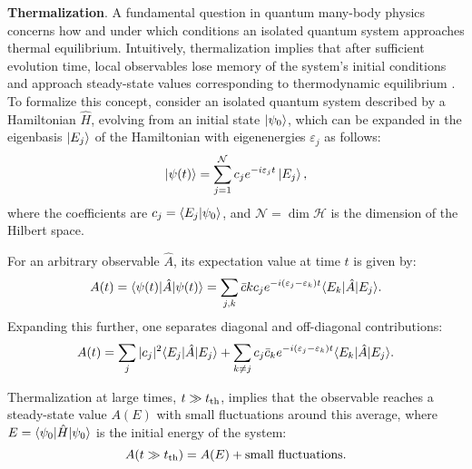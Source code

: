 



\textbf{Thermalization}.
A fundamental question in quantum many-body physics concerns how and under which conditions an isolated quantum system approaches thermal equilibrium. Intuitively, thermalization implies that after sufficient evolution time, local observables lose memory of the system's initial conditions and approach steady-state values corresponding to thermodynamic equilibrium \cite{khlebnikov_thermalization_2014}. To formalize this concept, consider an isolated quantum system described by a Hamiltonian $\hat{H}$, evolving from an initial state $\left| \psi_0 \right\rangle$, which can be expanded in the eigenbasis ${\left| E_j \right\rangle}$ of the Hamiltonian with eigenenergies $\varepsilon_j$ as follows:
\begin{equation}
\left| \psi(t) \right\rangle = \sum_{j=1}^{\mathcal{N}} c_j e^{- i \varepsilon_j t} \left| E_j \right\rangle,
\label{eq:evolution}
\end{equation}
where the coefficients are $c_j = \bk{E_j}{\psi_0}$, and $\mathcal{N} = \dim\mathcal{H}$ is the dimension of the Hilbert space.

For an arbitrary observable $\hat{A}$, its expectation value at time $t$ is given by:
\begin{equation}
A(t) = \bk{\psi(t)}[\hat{A}]{\psi(t)}
= \sum_{j,k} \bar{c}k c_j e^{-i (\varepsilon_j - \varepsilon_k) t} \bk{E_k}[\hat{A}]{E_j}.
\label{eq:observable_time}
\end{equation}
Expanding this further, one separates diagonal and off-diagonal contributions:
\begin{equation}
A(t) = \sum_j |c_j|^2 \bk{E_j}[\hat{A}]{E_j}
+ \sum_{k \neq j} c_j \bar{c}_k e^{-i (\varepsilon_j - \varepsilon_k) t} \bk{E_k}[\hat{A}]{E_j}.
\label{eq:At_expanded}
\end{equation}

Thermalization at large times, $t \gg t_{\textnormal{th}}$, implies that the observable reaches a steady-state value $A(E)$ with small fluctuations around this average, where $E = \bk{\psi_0}[\hat{H}]{\psi_0}$ is the initial energy of the system:
\begin{equation}
A(t \gg t_{\textnormal{th}}) = A(E) + \text{small fluctuations}.
\label{eq:thermal_limit}
\end{equation}

